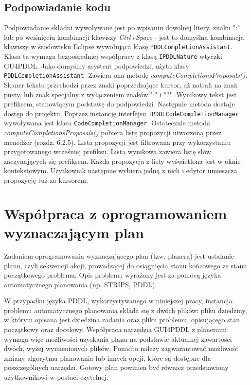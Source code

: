\subsection{Podpowiadanie kodu}
Podpowiadanie składni wywoływane jest po wpisaniu dowolnej litery, znaku ":" lub po wciśnięciu kombinacji klawiszy \emph{Ctrl+Space} - jest to domyślna kombinacja klawiszy w środowisku Eclipse wywołująca klasę \texttt{PDDLCompletionAssistant}. Klasa ta wymaga bezpośredniej współpracy z klasą \texttt{IPDDLNature} wtyczki GU4PDDL. Jako domyślny asystent podpowiedzi, użyto klasy \texttt{PDDLCompletionAssistant}. Zawiera ona metodę \emph{computeCompletionsProposals()}. Skaner tekstu przechodzi przez znaki poprzedzające kursor, aż natrafi na znak pusty, lub znak specjalny z wyłączeniem znaków ":" i "?". Wynikowy tekst jest prefiksem, stanowiącym podstawę do podpowiedzi. Następnie metoda dostaje dostęp do projektu. Poprzez instancję interfejsu \texttt{IPDDLCodeCompletionManager} wywoływana jest klasa \texttt{CodeCompletionManager}. Ostatecznie metoda \emph{computeCompletionsProposals()} pobiera listę propozycji utworzoną przez menedżer (rozdz. 6.2.5). Lista propozycji jest filtrowana przy wykorzystaniu przygotowanego wcześniej prefiksu. Lista wynikowa zawiera listę słów zaczynających się prefiksem. Każda propozycja z listy wyświetlona jest w oknie kontekstowym. Użytkownik następnie wybiera jedną z nich i edytor umieszcza propozycję tuż za kursorem.





\section{Współpraca z oprogramowaniem wyznaczającym plan}
\label{sec:wspolpraca}
Zadaniem oprogramowania wyznaczającego plan (tzw. planera) jest ustalanie planu, czyli sekwencji akcji,  prowadzącej do osiągnięcia stanu końcowego ze stanu początkowego problemu. Opis problemu wyrażony jest za pomocą języka automatycznego planowania (np. STRIPS, PDDL). 

W przypadku języka PDDL, wykorzystywanego w niniejszej pracy, instancja problemu automatycznego planowania składa się z dwóch plików: pliku dziedziny, w którym opisana jest dziedzina zadania oraz pliku problemu, opisującego stan początkowy oraz docelowy. Współpraca narzędzia GUI4PDDL z planerami wymaga więc możliwości uzyskania planu na podstawie aktualnej zawartości dwóch, wyżej wymienionych plików. Ponadto należy zagwarantować możliwość zmiany algorytmu planowania lub innych opcji, które są dostępne dla poszczególnych narzędzi. Gotowy plan powinien być również przedstawiony użytkownikowi w postaci czytelnej.

